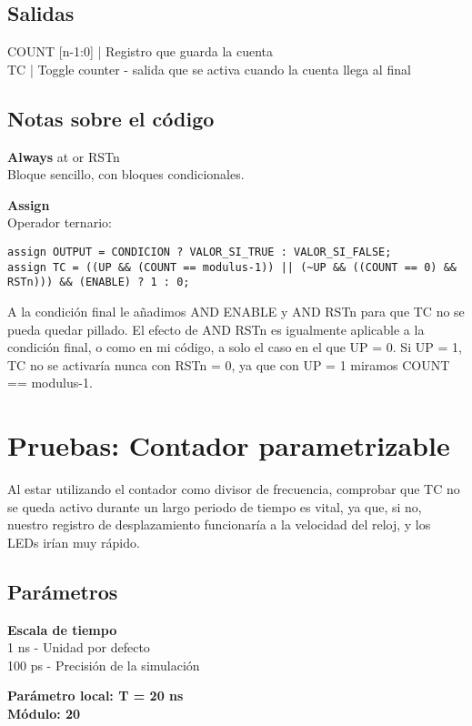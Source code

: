 \documentclass{article}
\newcommand{\iconpath}{/home/khz/git/tabler-icons/icons/outline-white/}
\newcommand{\icon}[1]{}
\begin{document}
\subsection{Salidas}
\icon{clock} \icon{arrow-right} \icon{matrix} COUNT [n-1:0] | Registro que guarda la cuenta \\
\icon{clock-off} \icon{arrow-right} \icon{s-turn-up} TC | Toggle counter - salida que se activa cuando la cuenta llega al final

\subsection{Notas sobre el código}
\begin{flushleft}
\textbf{Always} at \icon{s-turn-up} \icon{clock} or \icon{s-turn-down} RSTn \\
Bloque sencillo, con bloques condicionales. \\
\end{flushleft}
\textbf{Assign} \\
Operador ternario: 
\begin{lstlisting}[style=verilog]
assign OUTPUT = CONDICION ? VALOR_SI_TRUE : VALOR_SI_FALSE;
assign TC = ((UP && (COUNT == modulus-1)) || (~UP && ((COUNT == 0) && RSTn))) && (ENABLE) ? 1 : 0;
\end{lstlisting}
A la condición final le añadimos AND ENABLE y AND RSTn para que TC no se pueda quedar pillado.
El efecto de AND RSTn es igualmente aplicable a la condición final, o como en mi código, a solo el caso en el que UP = 0. Si UP = 1, TC no se activaría nunca con RSTn = 0, ya que con UP = 1 miramos COUNT == modulus-1.


\newpage

\section{Pruebas: Contador parametrizable}
Al estar utilizando el contador como divisor de frecuencia, comprobar que TC no se queda activo durante un largo periodo de tiempo es vital, ya que, si no, nuestro registro de desplazamiento funcionaría a la velocidad del reloj, y los LEDs irían muy rápido.
\subsection{Parámetros}
\begin{flushleft}
\textbf{Escala de tiempo} \\
1 ns - Unidad por defecto \\
100 ps - Precisión de la simulación \\
\end{flushleft}
\textbf{Parámetro local: T = 20 ns} \\
\textbf{Módulo: 20}
\end{document}
